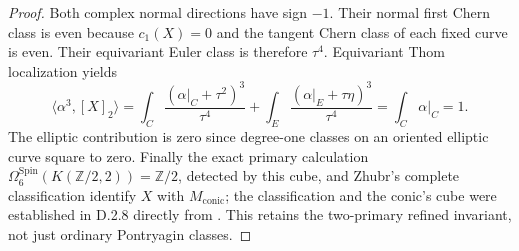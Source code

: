 \begin{proof}
Both complex normal directions have sign $-1$. Their normal first
Chern class is even because $c_1(X)=0$ and the tangent Chern class of
each fixed curve is even. Their equivariant Euler class is therefore
$\tau^4$. Equivariant Thom localization yields
\[
 \langle\alpha^3,[X]_2\rangle
 =\int_C\frac{(\alpha|_C+\tau^2)^3}{\tau^4}
  +\int_E\frac{(\alpha|_E+\tau\eta)^3}{\tau^4}
 =\int_C\alpha|_C=1.
\]
The elliptic contribution is zero since degree-one classes on an
oriented elliptic curve square to zero. Finally the exact primary
calculation
$\Omega^{\mathrm{Spin}}_6(K(\mathbb Z/2,2))=\mathbb Z/2$,
detected by this cube, and Zhubr's complete classification identify
$X$ with $M_{\mathrm{conic}}$; the classification and the conic's cube
were established in D.2.8 directly from
\cite[Theorems 3, 2.10 and Section 3.12]{manZhubr75}.
This retains the two-primary refined invariant, not just ordinary
Pontryagin classes.
\end{proof}
